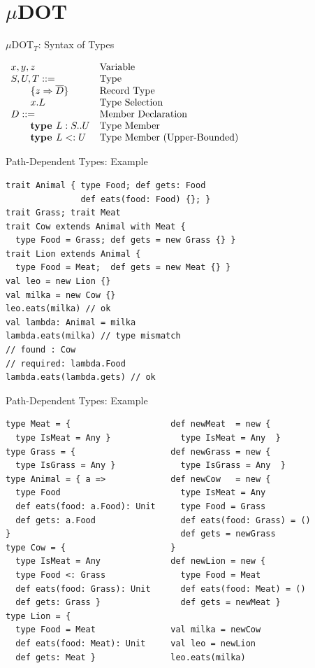 \documentclass{beamer}
\begin{document}
\section{$\mu$DOT}


\begin{frame}[fragile]{${\mu}${DOT}$_T$: Syntax of Types}

$\begin{array}{ll}
x, y, z & \mbox{Variable} \\
S, U, T ::= & \mbox{Type} \\
\quad\quad  \{z \Rightarrow \overline{D}\} & \mbox{Record Type} \\
\quad\quad  x.L & \mbox{Type Selection} \\
D ::= & \mbox{Member Declaration}\\
\quad\quad  \textbf{type } L : S .. U & \mbox{Type Member}\\
\quad\quad  \textbf{type } L <: U    & \mbox{Type Member (Upper-Bounded)}
\end{array}$

\end{frame}


\begin{frame}[fragile]{Path-Dependent Types: Example}
\begin{verbatim}
trait Animal { type Food; def gets: Food
               def eats(food: Food) {}; }
trait Grass; trait Meat
trait Cow extends Animal with Meat {
  type Food = Grass; def gets = new Grass {} }
trait Lion extends Animal {
  type Food = Meat;  def gets = new Meat {} }
val leo = new Lion {}
val milka = new Cow {}
leo.eats(milka) // ok
val lambda: Animal = milka
lambda.eats(milka) // type mismatch
// found : Cow
// required: lambda.Food
lambda.eats(lambda.gets) // ok
\end{verbatim}
\end{frame}


\begin{frame}[fragile]{Path-Dependent Types: Example}
\begin{verbatim}
type Meat = {                    def newMeat  = new {
  type IsMeat = Any }              type IsMeat = Any  }
type Grass = {                   def newGrass = new {
  type IsGrass = Any }             type IsGrass = Any  }
type Animal = { a =>             def newCow   = new {
  type Food                        type IsMeat = Any
  def eats(food: a.Food): Unit     type Food = Grass
  def gets: a.Food                 def eats(food: Grass) = ()
}                                  def gets = newGrass
type Cow = {                     }
  type IsMeat = Any              def newLion = new {
  type Food <: Grass               type Food = Meat
  def eats(food: Grass): Unit      def eats(food: Meat) = ()
  def gets: Grass }                def gets = newMeat }
type Lion = {
  type Food = Meat               val milka = newCow
  def eats(food: Meat): Unit     val leo = newLion
  def gets: Meat }               leo.eats(milka)
\end{verbatim}
\end{frame}
\end{document}
